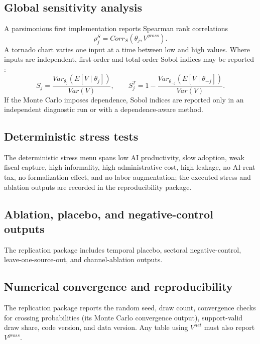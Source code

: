 \documentclass[11pt,a4paper]{article}
\begin{document}
\subsection{Global sensitivity analysis}

A parsimonious first implementation reports Spearman rank correlations
\begin{equation}
    \rho^S_j=Corr_S(\theta_j,V^{gross}).
\end{equation}
A tornado chart varies one input at a time between low and high values. Where inputs are independent, first-order and total-order Sobol indices may be reported \citep{morris1991factorial,saltelli2008global,sobol2001global}:
\begin{equation}
    S_j=\frac{Var_{\theta_j}(E[V\mid\theta_j])}{Var(V)},
    \qquad
    S^T_j=1-\frac{Var_{\theta_{-j}}(E[V\mid\theta_{-j}])}{Var(V)}.
\end{equation}
If the Monte Carlo imposes dependence, Sobol indices are reported only in an independent diagnostic run or with a dependence-aware method.

\subsection{Deterministic stress tests}

The deterministic stress menu spans low AI productivity, slow adoption, weak fiscal capture, high informality, high administrative cost, high leakage, no AI-rent tax, no formalization effect, and no labor augmentation; the executed stress and ablation outputs are recorded in the reproducibility package.

\subsection{Ablation, placebo, and negative-control outputs}

The replication package includes temporal placebo, sectoral negative-control, leave-one-source-out, and channel-ablation outputs.

\subsection{Numerical convergence and reproducibility}

The replication package reports the random seed, draw count, convergence checks for crossing probabilities (its Monte Carlo convergence output), support-valid draw share, code version, and data version. Any table using $V^{net}$ must also report $V^{gross}$.
\end{document}
